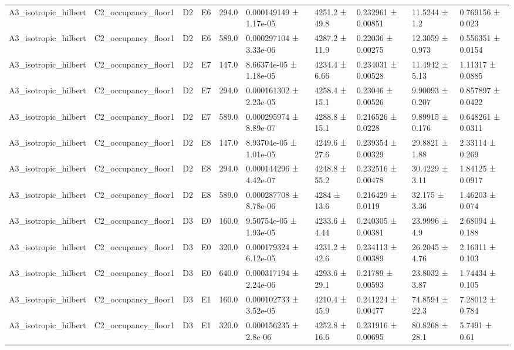 \begin{table}
\begin{tabular}{llllllllll}
A3\_isotropic\_hilbert & C2\_occupancy\_floor1 & D2 & E6 & 294.0 & 0.000149149 ± 1.17e-05 & 4251.2 ± 49.8 & 0.232961 ± 0.00851 & 11.5244 ± 1.2 & 0.769156 ± 0.023 \\
A3\_isotropic\_hilbert & C2\_occupancy\_floor1 & D2 & E6 & 589.0 & 0.000297104 ± 3.33e-06 & 4287.2 ± 11.9 & 0.22036 ± 0.00275 & 12.3059 ± 0.973 & 0.556351 ± 0.0154 \\
A3\_isotropic\_hilbert & C2\_occupancy\_floor1 & D2 & E7 & 147.0 & 8.66374e-05 ± 1.18e-05 & 4234.4 ± 6.66 & 0.234031 ± 0.00528 & 11.4942 ± 5.13 & 1.11317 ± 0.0885 \\
A3\_isotropic\_hilbert & C2\_occupancy\_floor1 & D2 & E7 & 294.0 & 0.000161302 ± 2.23e-05 & 4258.4 ± 15.1 & 0.23046 ± 0.00526 & 9.90093 ± 0.207 & 0.857897 ± 0.0422 \\
A3\_isotropic\_hilbert & C2\_occupancy\_floor1 & D2 & E7 & 589.0 & 0.000295974 ± 8.89e-07 & 4288.8 ± 15.1 & 0.216526 ± 0.0228 & 9.89915 ± 0.176 & 0.648261 ± 0.0311 \\
A3\_isotropic\_hilbert & C2\_occupancy\_floor1 & D2 & E8 & 147.0 & 8.93704e-05 ± 1.01e-05 & 4249.6 ± 27.6 & 0.239354 ± 0.00329 & 29.8821 ± 1.88 & 2.33114 ± 0.269 \\
A3\_isotropic\_hilbert & C2\_occupancy\_floor1 & D2 & E8 & 294.0 & 0.000144296 ± 4.42e-07 & 4248.8 ± 55.2 & 0.232516 ± 0.00478 & 30.4229 ± 3.11 & 1.84125 ± 0.0917 \\
A3\_isotropic\_hilbert & C2\_occupancy\_floor1 & D2 & E8 & 589.0 & 0.000287708 ± 8.78e-06 & 4284 ± 13.6 & 0.216429 ± 0.0119 & 32.175 ± 3.36 & 1.46203 ± 0.074 \\
A3\_isotropic\_hilbert & C2\_occupancy\_floor1 & D3 & E0 & 160.0 & 9.50754e-05 ± 1.93e-05 & 4233.6 ± 4.44 & 0.240305 ± 0.00381 & 23.9996 ± 4.9 & 2.68094 ± 0.188 \\
A3\_isotropic\_hilbert & C2\_occupancy\_floor1 & D3 & E0 & 320.0 & 0.000179324 ± 6.12e-05 & 4231.2 ± 42.6 & 0.234113 ± 0.00389 & 26.2045 ± 4.76 & 2.16311 ± 0.103 \\
A3\_isotropic\_hilbert & C2\_occupancy\_floor1 & D3 & E0 & 640.0 & 0.000317194 ± 2.24e-06 & 4293.6 ± 29.1 & 0.21789 ± 0.00593 & 23.8032 ± 3.87 & 1.74434 ± 0.105 \\
A3\_isotropic\_hilbert & C2\_occupancy\_floor1 & D3 & E1 & 160.0 & 0.000102733 ± 3.52e-05 & 4210.4 ± 45.9 & 0.241224 ± 0.00477 & 74.8594 ± 22.3 & 7.28012 ± 0.784 \\
A3\_isotropic\_hilbert & C2\_occupancy\_floor1 & D3 & E1 & 320.0 & 0.000156235 ± 2.8e-06 & 4252.8 ± 16.6 & 0.231916 ± 0.00695 & 80.8268 ± 28.1 & 5.7491 ± 0.61 \\

\end{tabular}
\end{table}

